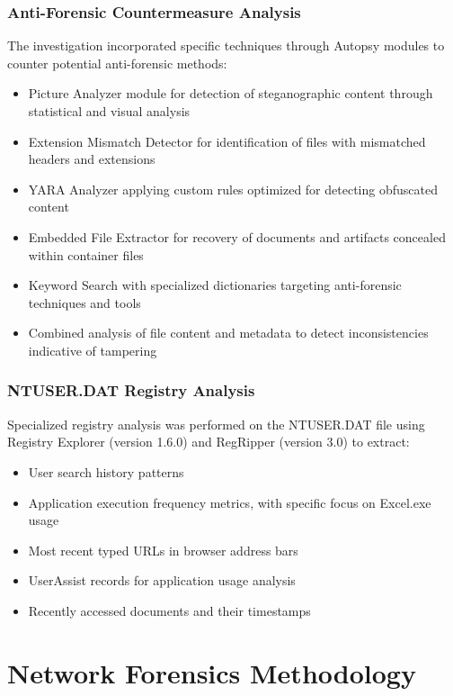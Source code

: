 \subsubsection{Anti-Forensic Countermeasure Analysis}
The investigation incorporated specific techniques through Autopsy modules to counter potential anti-forensic methods:
\begin{itemize}
    \item Picture Analyzer module for detection of steganographic content through statistical and visual analysis
    \item Extension Mismatch Detector for identification of files with mismatched headers and extensions
    \item YARA Analyzer applying custom rules optimized for detecting obfuscated content
    \item Embedded File Extractor for recovery of documents and artifacts concealed within container files
    \item Keyword Search with specialized dictionaries targeting anti-forensic techniques and tools
    \item Combined analysis of file content and metadata to detect inconsistencies indicative of tampering
\end{itemize}

\subsubsection{NTUSER.DAT Registry Analysis}
Specialized registry analysis was performed on the NTUSER.DAT file using Registry Explorer (version 1.6.0) and RegRipper (version 3.0) to extract:
\begin{itemize}
    \item User search history patterns
    \item Application execution frequency metrics, with specific focus on Excel.exe usage
    \item Most recent typed URLs in browser address bars
    \item UserAssist records for application usage analysis
    \item Recently accessed documents and their timestamps
\end{itemize}

\section{Network Forensics Methodology}

